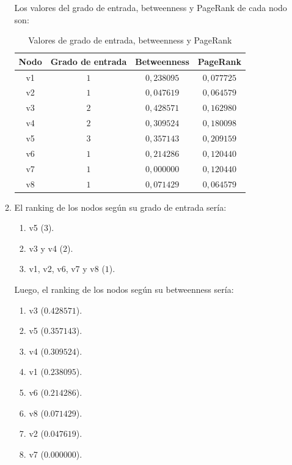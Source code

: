 \documentclass[12pt]{article}
\begin{document}
\begin{enumerate}
\begin{enumerate}
        Los valores del grado de entrada, betweenness y PageRank de cada nodo son:
        
        \begin{table}[H]
            \centering
            \begin{tabular}{|c|c|c|c|}
            \hline
            \textbf{Nodo} & \textbf{Grado de entrada} & \textbf{Betweenness} & \textbf{PageRank} \\ \hline
            v1 & $1$ & $0,238095$ & $0,077725$ \\ \hline
            v2 & $1$ & $0,047619$ & $0,064579$ \\ \hline
            v3 & $2$ & $0,428571$ & $0,162980$ \\ \hline
            v4 & $2$ & $0,309524$ & $0,180098$ \\ \hline
            v5 & $3$ & $0,357143$ & $0,209159$ \\ \hline
            v6 & $1$ & $0,214286$ & $0,120440$ \\ \hline
            v7 & $1$ & $0,000000$ & $0,120440$ \\ \hline
            v8 & $1$ & $0,071429$ & $0,064579$ \\ \hline
            \end{tabular}
            \caption{Valores de grado de entrada, betweenness y PageRank}
            \label{tab:values_red_chica}
        \end{table}

        \item El ranking de los nodos según su grado de entrada sería:
        \begin{enumerate}
            \item v5 ($3$).
            \item v3 y v4 ($2$).
            \item v1, v2, v6, v7 y v8 ($1$).
        \end{enumerate}

        Luego, el ranking de los nodos según su betweenness sería:
        \begin{enumerate}
            \item v3 ($0.428571$).
            \item v5 ($0.357143$).
            \item v4 ($0.309524$).
            \item v1 ($0.238095$).
            \item v6 ($0.214286$).
            \item v8 ($0.071429$).
            \item v2 ($0.047619$).
            \item v7 ($0.000000$).
        \end{enumerate}


\end{enumerate}
\end{enumerate}
\end{document}

